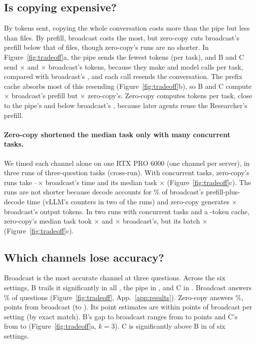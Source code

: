 \documentclass[sigplan,10pt,nonacm,review,anonymous]{acmart}
\begin{document}
\subsection{Is copying expensive?}
\label{sec:cost}

By tokens sent, copying the whole conversation costs more than the pipe but less than files. By prefill,
broadcast costs the most, but zero-copy cuts broadcast's prefill below that of files, though zero-copy's
runs are no shorter. In Figure~\ref{fig:tradeoff}a, the pipe sends the fewest tokens (\nSentATwo per task), and B
and C send \nSentRatioB{}$\times$ and \nSentRatioC{}$\times$ broadcast's tokens, because they make \nCallsB and
\nCallsC model calls per task, compared with broadcast's \nCallsAOne, and each call resends the conversation.
The prefix cache absorbs most of this resending (Figure~\ref{fig:tradeoff}b), so B and C compute
\nCompRatioB{}$\times$ broadcast's prefill but \nCompRatioBAZc{}$\times$ zero-copy's. Zero-copy computes
\nCompAZc tokens per task, close to the pipe's \nCompATwo and below broadcast's \nCompAOne, because later
agents reuse the Researcher's prefill.

\paragraph{Zero-copy shortened the median task only with many concurrent tasks.} We timed each channel
alone on one RTX PRO 6000 (one channel per server), in three runs of \nRSixAloneN three-question tasks
(cross-run). With \nConcWord concurrent tasks, zero-copy's runs take
\nRSixTimeAZcMin--\nRSixTimeAZcMax{}$\times$ broadcast's time and its median task \nRTwelveSixMedAZc{}$\times$ (Figure~\ref{fig:tradeoff}c).
The runs are not shorter because decode accounts for \nRSixDecodeShareAOne{}\% of broadcast's
prefill-plus-decode time (vLLM's counters in two of the runs) and zero-copy generates \nRSixGenAZc{}$\times$ broadcast's output tokens. In two runs with \nConcHi concurrent
tasks and a \nKvProHi-token cache, zero-copy's median task took \nRThirteenHiMedAZcMin{}$\times$ and
\nRThirteenHiMedAZcMax{}$\times$ broadcast's, but its batch \nRSixHiTimeAZc{}$\times$ (Figure~\ref{fig:tradeoff}c).

\subsection{Which channels lose accuracy?}
\label{sec:accuracy}

Broadcast is the most accurate channel at three questions. Across the six settings, B trails it
significantly in all \nGapBSigWord, the pipe in \nGapATwoSigWord, and C in \nGapCSigWord. Broadcast
answers \nAccAOne{}\% of questions (Figure~\ref{fig:tradeoff}, App.~\ref{app:results}). Zero-copy answers \nAccAZc{}\%,
\nZcPooledDiff points from broadcast (\nZcPooledDiffLo to \nZcPooledDiffHi). Its point estimates are within
\nGapAZcMax points of broadcast per setting (\nZcEmGapMax by exact match). B's gap to
broadcast ranges from \nGapBMin to \nGapBMax points and C's from \nGapCMin to \nGapCMax (Figure~\ref{fig:tradeoff}a, $k=3$). C is significantly above B in \nCoverBSigWord of
six settings.
\end{document}
